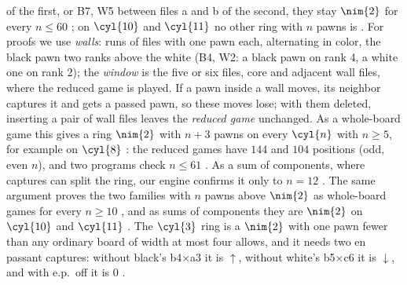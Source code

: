of the first, or B7, W5 between files a and b of the second, they stay $\nim{2}$ for every $n\le60$ ; on $\cyl{10}$ and $\cyl{11}$ no other ring with $n$ pawns is .
For proofs we use \emph{walls}: runs of files with one pawn each, alternating in color, the black pawn two
ranks above the white (B4, W2: a black pawn on rank 4, a white one on rank 2); the \emph{window} is the
five or six files, core and adjacent wall files, where the reduced game is played. If a pawn inside a wall moves, its neighbor captures it and gets a passed
pawn, so these moves lose; with them deleted, inserting a pair of wall files leaves the \emph{reduced game}
unchanged. As a whole-board game this gives a ring $\nim{2}$ with $n+3$ pawns on
every $\cyl{n}$ with $n\ge5$, for example  on $\cyl{8}$ : the
reduced games have $144$ and $104$ positions (odd, even $n$), and two programs check $n\le61$ . As a sum of components, where captures can split the ring, our engine confirms it only
to $n=12$ . The same argument proves the two families with $n$ pawns above $\nim{2}$ as whole-board games for every
$n\ge10$ , and as sums of components they are $\nim{2}$ on $\cyl{10}$ and $\cyl{11}$ . The $\cyl{3}$ ring is a $\nim{2}$ with one pawn fewer than any ordinary board of width at most four allows,
and it needs two en passant captures: without black's b4$\times$a3 it is $\uparrow$, without white's
b5$\times$c6 it is $\downarrow$, and with e.p.\ off it is $0$ .


